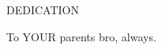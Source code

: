 \newpage
\thispagestyle{plain}
\vspace*{1cm}
\begin{center}
{\Large DEDICATION}
\end{center}
\vspace*{1cm}

\begin{center}
To YOUR parents bro, always.
\end{center}